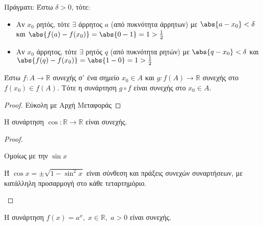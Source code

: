 \documentclass[main.tex]{subfiles}
\begin{document}
\begin{example}
\begin{description}
\begin{equation*}
            \end{equation*}
            Πράγματι:
            Έστω $ \delta > 0 $, τότε:
            \begin{itemize}
                \item Αν $ x_{0} $ ρητός, τότε $ \exists$  άρρητος $a$ (από 
                    πυκνότητα άρρητων) με
                    $ \abs{a - x_{0}} < \delta $ και $ \abs{f(a) - f(x_{0})} = 
                    \abs{0 - 1} = 1 > \frac{1}{2} $
                \item Αν $ x_{0} $ άρρητος, τότε $ \exists $ ρητός $q$ (από 
                    πυκνότητα ρητών) με 
                    $ \abs{q- x_{0}} < \delta $ και $ \abs{f(q) - f(x_{0})} = 
                    \abs{1 - 0} = 1 > \frac{1}{2} $
            \end{itemize}
    \end{description}
\end{example}

\begin{prop}
    Έστω $ f \colon A \to \mathbb{R} $ συνεχής σ᾽ ένα σημείο $ x_{0} \in A $ 
    και $ g \colon f(A) \to \mathbb{R} $ συνεχής στο $ f(x_{0}) \in f(A) $. 
    Τότε η συνάρτηση $ g \circ f $ είναι συνεχής στο $ x_{0} \in A $.
\end{prop}

\begin{proof}
    Εύκολη με Αρχή Μεταφοράς
\end{proof}

\begin{prop}
    Η συνάρτηση $ \cos{} \colon \mathbb{R} \to \mathbb{R} $ είναι συνεχής.
\end{prop}

\begin{proof}
\item {}
    \begin{myitemize}
    \item Ομοίως με την $ \sin{x} $
    \item Ή $ \cos{x} = \pm \sqrt{1- \sin^{2}{x}} $ είναι σύνθεση και 
        πράξεις συνεχών συναρτήσεων, με κατάλληλη προσαρμογή στο 
        κάθε τεταρτημόριο.
    \end{myitemize}
\end{proof}

\begin{prop}
    Η συνάρτηση $ f(x) = a^{x}, \; x \in \mathbb{R}, \; a>0 $ είναι συνεχής.
\end{prop}
\end{document}
